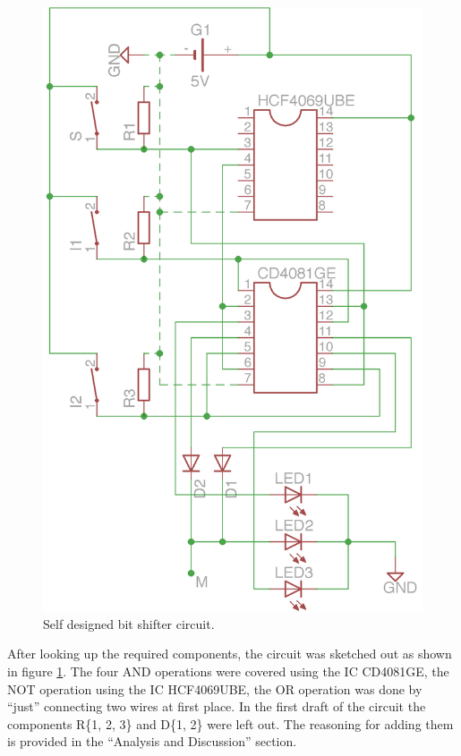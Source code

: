 \documentclass[journal]{IEEEtran}
\begin{document}
\begin{figure}[h!]
  \centering
   \includegraphics[]{boards/shifter.png}
   \caption{Self designed bit shifter circuit.}
   \label{fig:shifter}
\end{figure}

After looking up the required components, the circuit was sketched out as shown
in figure \ref{fig:shifter}. The four AND operations were covered using the IC
CD4081GE, the NOT operation using the IC HCF4069UBE, the OR operation was done
by ``just'' connecting two wires at first place. In the first draft of
the circuit the components R\{1, 2, 3\} and D\{1, 2\} were left
out. The reasoning for adding them is provided in the ``Analysis and
Discussion'' section.
\end{document}
